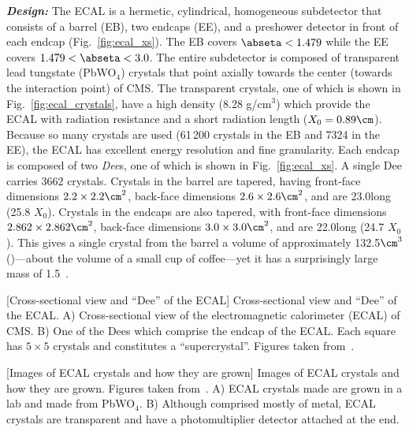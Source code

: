 \textit{\textbf{Design:}}
The ECAL is a hermetic, cylindrical, homogeneous subdetector that consists of a barrel (EB), two endcaps (EE), and a preshower detector in front of each endcap (Fig.~\ref{fig:ecal_xs}).
The EB covers $\abseta < 1.479$ while the EE covers $1.479 < \abseta < 3.0$.
The entire subdetector is composed of transparent lead tungstate (PbWO$_4$) crystals that point axially towards the center (\ie towards the interaction point) of CMS.
The transparent crystals, one of which is shown in Fig.~\ref{fig:ecal_crystals}, have a high density (8.28 g/cm$^3$) which provide the ECAL with radiation resistance and a short radiation length ($X_0 = 0.89\cm$).
Because so many crystals are used (61\,200 crystals in the EB and 7324 in the EE), the ECAL has excellent energy resolution and fine granularity.
Each endcap is composed of two \emph{Dee}s, one of which is shown in Fig.~\ref{fig:ecal_xs}.
A single Dee carries 3662 crystals.
Crystals in the barrel are tapered, having front-face dimensions $2.2 \times 2.2\cm^2$, back-face dimensions $2.6 \times 2.6\cm^2$, and are 23.0\cm long (25.8 $X_0$).
Crystals in the endcaps are also tapered, with front-face dimensions $2.862 \times 2.862\cm^2$, back-face dimensions $3.0 \times 3.0\cm^2$, and are 22.0\cm long (24.7 $X_0$).
This gives a single crystal from the barrel a volume of approximately 132.5$\cm^3$ (\mL)---about the volume of a small cup of coffee---yet it has a surprisingly large mass of 1.5\Kg~\cite{particle_data_group_review_2020}.
\begin{multiFigure}
    \centering
        [Cross-sectional view and ``Dee'' of the ECAL]
        {Cross-sectional view and ``Dee'' of the ECAL.
        \;A) Cross-sectional view of the electromagnetic calorimeter (ECAL) of CMS.
        \;B) One of the Dees which comprise the endcap of the ECAL.
        Each square has $5 \times 5$ crystals and constitutes a ``supercrystal''.
        Figures taken from~\cite{collaboration_cms_2008}.
        }
    \label{fig:ecal_xs}
\end{multiFigure}
\begin{multiFigure}
    \centering
        [Images of ECAL crystals and how they are grown]
        {Images of ECAL crystals and how they are grown.
        Figures taken from~\cite{ecal_crystal_lab}.
        \;A) ECAL crystals made are grown in a lab and made from PbWO$_4$.
        \;B) Although comprised mostly of metal, ECAL crystals are transparent and have a photomultiplier detector attached at the end.
        } 
    \label{fig:ecal_crystals}
\end{multiFigure}

